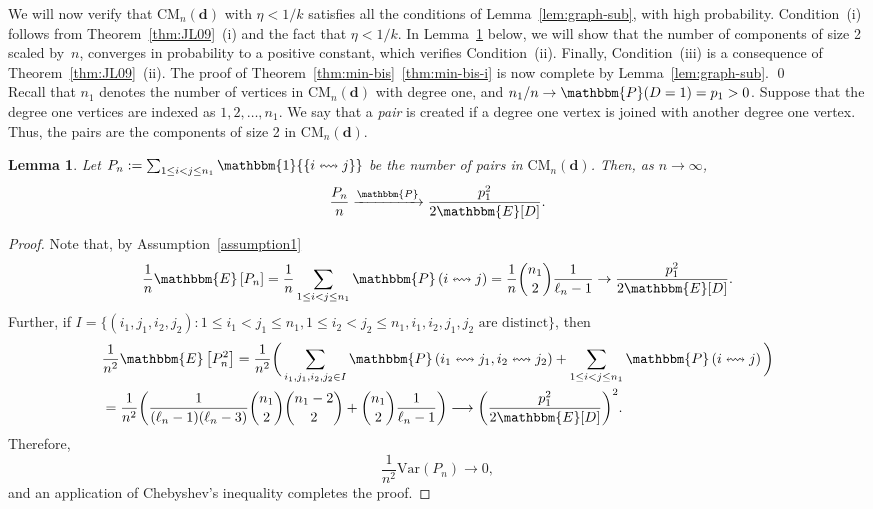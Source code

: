 \documentclass[11pt,a4paper, reqno]{article}
\numberwithin{equation}{section}
\numberwithin{equation}{section}
\newcommand{\prob}[1]{\ensuremath{\mathbbm{P}\left(#1\right)}}
\newcommand{\expt}[1]{\ensuremath{\mathbbm{E}\left[#1\right]}}
\newcommand{\var}[1]{\ensuremath{\mathrm{Var}\left(#1\right)}}
\newcommand{\ind}[1]{\ensuremath{\mathbbm{1}{\left\{#1\right\}}}}
\newcommand{\pto}{\ensuremath{\xrightarrow{\mathbbm{P}}}}
\newcommand{\PR}{\ensuremath{\mathbbm{P}}}
\newcommand{\E}{\ensuremath{\mathbbm{E}}}
\newcommand{\1}{\ensuremath{\mathbbm{1}}}
\newcommand{\CM}{\ensuremath{\mathrm{CM}_n(\boldsymbol{d})}}
\newtheorem{lemma}[theorem]{Lemma}
\numberwithin{equation}{section}
\numberwithin{theorem}{section}
\begin{document}
We will now verify that $\CM$ with $\eta<1/k$ satisfies all the conditions of Lemma~\ref{lem:graph-sub}, with high probability.
Condition~(i) follows from Theorem~\ref{thm:JL09}~(i) and the fact that $\eta<1/k$. 
In Lemma~\ref{lem:num-pairs} below, we will show that the number of components of size 2 scaled by~$n$, converges in probability to a positive constant, which verifies Condition~(ii).
Finally, Condition~(iii) is a consequence of Theorem~\ref{thm:JL09}~(ii).
The proof of Theorem~\ref{thm:min-bis}~\eqref{thm:min-bis-i} is now complete by Lemma~\ref{lem:graph-sub}.
\qed\\


 Recall that $n_1$ denotes the number of vertices in $\CM$ with degree one, and $n_1/n\to \PR(D=1) = p_1>0$. Suppose that the degree one vertices are indexed as $1,2,\dots,n_1$.
 We say that a \emph{pair} is created if a degree one vertex is joined with another degree one vertex. 
 Thus, the pairs are the components of size 2 in $\CM$.
\begin{lemma}
\label{lem:num-pairs} 
Let $P_n:=\sum_{1\leq i<j \leq n_1}\ind{i\leftrightsquigarrow j}$ be the number of pairs in \CM. Then, as $n\to\infty$, 
$$\frac{P_n}{n}\pto \frac{p_1^2}{2\E[D]}.$$
\end{lemma}
\begin{proof}
 Note that, by Assumption~\ref{assumption1}
 \begin{equation}
  \frac{1}{n}\expt{P_n}= \frac{1}{n}\sum_{1\leq i<j\leq n_1}\prob{i\leftrightsquigarrow j} = \frac{1}{n}\binom{n_1}{2}\frac{1}{\ell_n-1}\to \frac{p_1^2}{2\E[D]}.
 \end{equation} Further, if $I=\{(i_1,j_1,i_2,j_2): 1\leq i_1<j_1\leq n_1, 1\leq i_2<j_2\leq n_1, i_1,i_2,j_1,j_2 \text{ are distinct}\}$, then
 \begin{equation}
 \begin{split}
  &\frac{1}{n^2}\expt{P_n^2} = \frac{1}{n^2}\bigg(\sum_{i_1,j_1,i_2,j_2\in I}\prob{i_1\leftrightsquigarrow j_1, i_2\leftrightsquigarrow j_2} +\sum_{1\leq i<j\leq n_1}\prob{i\leftrightsquigarrow j} \bigg)\\
  &= \frac{1}{n^2}\bigg(\frac{1}{(\ell_n-1)(\ell_n-3)}\binom{n_1}{2}\binom{n_1-2}{2}+\binom{n_1}{2}\frac{1}{\ell_n-1}\bigg)\longrightarrow \bigg(\frac{p_1^2}{2\E[D]}\bigg)^2.
  \end{split}
 \end{equation}
 Therefore,
 \begin{equation}
  \frac{1}{n^2}\var{P_n}\to 0,
 \end{equation} 
 and an application of Chebyshev's inequality completes the proof.
\end{proof}
\end{document}
